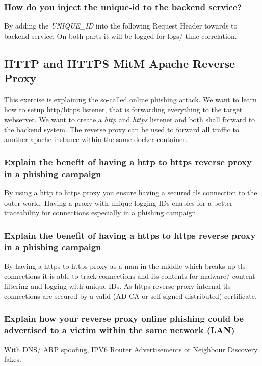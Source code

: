 \subsubsection{How do you inject the unique-id to the backend service?}
By adding the \textit{UNIQUE\_ID} into the following Request Header towards to backend service. On both parts it will be logged for logs/ time correlation.

\newpage

\subsection{HTTP and HTTPS MitM Apache Reverse Proxy}
This exercise is explaining the so-called online phishing attack. We want to learn how to setup http/https listener, that is forwarding everything to the target webserver. We want to create a \textit{http} and \textit{https} listener and both shall forward to the backend system.
The reverse proxy can be used to forward all traffic to another apache instance within the same docker container.

\subsubsection{Explain the benefit of having a http to https reverse proxy in a phishing campaign}
By using a http to https proxy you ensure having a secured tls connection to the outer world. Having a proxy with unique logging IDs enables for a better traceability for connections especially in a phishing campaign.

\subsubsection{Explain the benefit of having a https to https reverse proxy in a phishing campaign}
By having a https to https proxy as a man-in-the-middle which breaks up tls connections it is able to track connections and its contents for malware/ content filtering and logging with unique IDs. As https reverse proxy internal tls connections are secured by a valid (AD-CA or self-signed distributed) certificate.

\subsubsection{Explain how your reverse proxy online phishing could be advertised to a victim within the same network (LAN)}
With DNS/ ARP spoofing, IPV6 Router Advertisements or Neighbour Discovery fakes.


